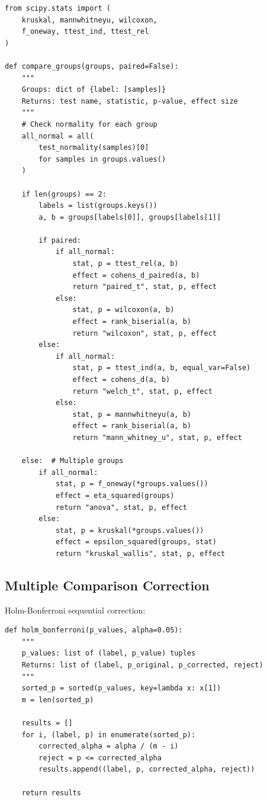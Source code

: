 \begin{verbatim}
from scipy.stats import (
    kruskal, mannwhitneyu, wilcoxon,
    f_oneway, ttest_ind, ttest_rel
)

def compare_groups(groups, paired=False):
    """
    Groups: dict of {label: [samples]}
    Returns: test name, statistic, p-value, effect size
    """
    # Check normality for each group
    all_normal = all(
        test_normality(samples)[0] 
        for samples in groups.values()
    )
    
    if len(groups) == 2:
        labels = list(groups.keys())
        a, b = groups[labels[0]], groups[labels[1]]
        
        if paired:
            if all_normal:
                stat, p = ttest_rel(a, b)
                effect = cohens_d_paired(a, b)
                return "paired_t", stat, p, effect
            else:
                stat, p = wilcoxon(a, b)
                effect = rank_biserial(a, b)
                return "wilcoxon", stat, p, effect
        else:
            if all_normal:
                stat, p = ttest_ind(a, b, equal_var=False)
                effect = cohens_d(a, b)
                return "welch_t", stat, p, effect
            else:
                stat, p = mannwhitneyu(a, b)
                effect = rank_biserial(a, b)
                return "mann_whitney_u", stat, p, effect
    
    else:  # Multiple groups
        if all_normal:
            stat, p = f_oneway(*groups.values())
            effect = eta_squared(groups)
            return "anova", stat, p, effect
        else:
            stat, p = kruskal(*groups.values())
            effect = epsilon_squared(groups, stat)
            return "kruskal_wallis", stat, p, effect
\end{verbatim}

\subsection{Multiple Comparison Correction}

Holm-Bonferroni sequential correction:

\begin{verbatim}
def holm_bonferroni(p_values, alpha=0.05):
    """
    p_values: list of (label, p_value) tuples
    Returns: list of (label, p_original, p_corrected, reject)
    """
    sorted_p = sorted(p_values, key=lambda x: x[1])
    m = len(sorted_p)
    
    results = []
    for i, (label, p) in enumerate(sorted_p):
        corrected_alpha = alpha / (m - i)
        reject = p <= corrected_alpha
        results.append((label, p, corrected_alpha, reject))
    
    return results
\end{verbatim}

